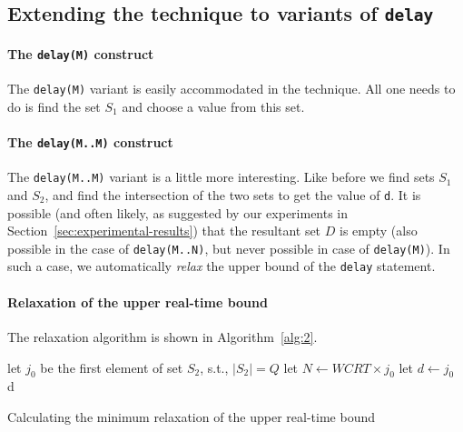 \subsection{Extending the technique to variants of \texttt{delay}}
\label{sec:extend-tehcn-vari}

\paragraph{The \texttt{delay(M)} construct}
\label{sec:extend-techn-vari}

The \texttt{delay(M)} variant is easily accommodated in the
technique. All one needs to do is find the set $S_1$ and choose a value
from this set.

\paragraph{The \texttt{delay(M..M)} construct}
\label{sec:extend-techn-vari}

The \texttt{delay(M..M)} variant is a little more interesting. Like
before we find sets $S_1$ and $S_2$, and find the intersection of the
two sets to get the value of \texttt{d}. It is possible (and often
likely, as suggested by our experiments in
Section~\ref{sec:experimental-results}) that the resultant set $D$ is
empty (also possible in the case of \texttt{delay(M..N)}, but never
possible in case of \texttt{delay(M)}). In such a case, we automatically
\textit{relax} the upper bound of the \texttt{delay} statement.


\paragraph{Relaxation of the upper real-time bound}
\label{sec:over-appr-relax}

The relaxation algorithm is shown in Algorithm~\ref{alg:2}.
  
\begin{algorithm}[t!]
  \begin{minipage}{1.0\linewidth}
    \SetAlgoLined
     {
      let $j_{0}$ be the first element of set $S_2$, s.t., $|S_2|=Q$\;
      \ShowLn let $N \leftarrow WCRT \times j_0$\;
      let $d \leftarrow j_0$\;
    }
    \Return d\;
    \caption{Calculating the minimum relaxation of the upper real-time
      bound}
    \label{alg:2}
  \end{minipage}
\end{algorithm}


